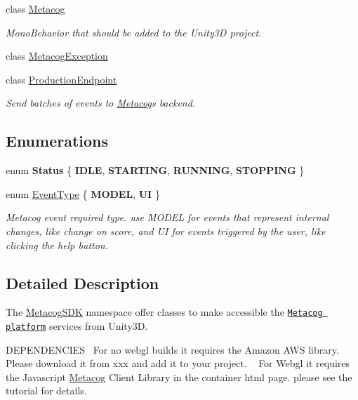 \begin{DoxyCompactItemize}
class \hyperlink{classMetacogSDK_1_1Metacog}{Metacog}
\begin{DoxyCompactList}\small\item\em Mono\+Behavior that should be added to the Unity3D project. \end{DoxyCompactList}\item 
class \hyperlink{classMetacogSDK_1_1MetacogException}{Metacog\+Exception}
\item 
class \hyperlink{classMetacogSDK_1_1ProductionEndpoint}{Production\+Endpoint}
\begin{DoxyCompactList}\small\item\em Send batches of events to \hyperlink{classMetacogSDK_1_1Metacog}{Metacog}\textquotesingle{}s backend. \end{DoxyCompactList}\end{DoxyCompactItemize}
\subsection*{Enumerations}
\begin{DoxyCompactItemize}
\item 
enum {\bfseries Status} \{ {\bfseries I\+D\+LE}, 
{\bfseries S\+T\+A\+R\+T\+I\+NG}, 
{\bfseries R\+U\+N\+N\+I\+NG}, 
{\bfseries S\+T\+O\+P\+P\+I\+NG}
 \}\hypertarget{namespaceMetacogSDK_adb09f0e6c9abe254160c91be5ac0c9b1}{}\label{namespaceMetacogSDK_adb09f0e6c9abe254160c91be5ac0c9b1}

\item 
enum \hyperlink{namespaceMetacogSDK_a9a46be6b2e98a6ae7460c93faf69728e}{Event\+Type} \{ {\bfseries M\+O\+D\+EL}, 
{\bfseries UI}
 \}\begin{DoxyCompactList}\small\item\em Metacog event required type. use M\+O\+D\+EL for events that represent internal changes, like change on score, and UI for events triggered by the user, like clicking the help button. \end{DoxyCompactList}
\end{DoxyCompactItemize}


\subsection{Detailed Description}
The \hyperlink{namespaceMetacogSDK}{Metacog\+S\+DK} namespace offer classes to make accessible the \href{}{\tt Metacog platform} services from Unity3D. 

D\+E\+P\+E\+N\+D\+E\+N\+C\+I\+ES~\newline
 For no webgl builds it requires the Amazon A\+WS library. Please download it from xxx and add it to your project. ~\newline
 For Webgl it requires the Javascript \hyperlink{classMetacogSDK_1_1Metacog}{Metacog} Client Library in the container html page. please see the tutorial for details.  

